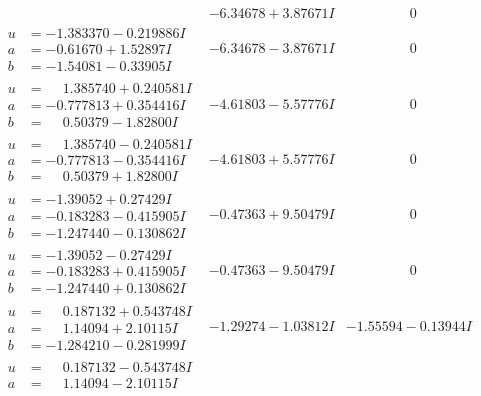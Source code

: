 \documentclass[1p]{elsarticle_modified}
\theoremstyle{definition}
\begin{document}
$$\begin{array}{c|c|c}
 & -6.34678 + 3.87671 I & \phantom{-0.000000 } 0 \\ \hline\begin{aligned}
u &= -1.383370 - 0.219886 I \\
a &= -0.61670 + 1.52897 I \\
b &= -1.54081 - 0.33905 I\end{aligned}
 & -6.34678 - 3.87671 I & \phantom{-0.000000 } 0 \\ \hline\begin{aligned}
u &= \phantom{-}1.385740 + 0.240581 I \\
a &= -0.777813 + 0.354416 I \\
b &= \phantom{-}0.50379 - 1.82800 I\end{aligned}
 & -4.61803 - 5.57776 I & \phantom{-0.000000 } 0 \\ \hline\begin{aligned}
u &= \phantom{-}1.385740 - 0.240581 I \\
a &= -0.777813 - 0.354416 I \\
b &= \phantom{-}0.50379 + 1.82800 I\end{aligned}
 & -4.61803 + 5.57776 I & \phantom{-0.000000 } 0 \\ \hline\begin{aligned}
u &= -1.39052 + 0.27429 I \\
a &= -0.183283 - 0.415905 I \\
b &= -1.247440 - 0.130862 I\end{aligned}
 & -0.47363 + 9.50479 I & \phantom{-0.000000 } 0 \\ \hline\begin{aligned}
u &= -1.39052 - 0.27429 I \\
a &= -0.183283 + 0.415905 I \\
b &= -1.247440 + 0.130862 I\end{aligned}
 & -0.47363 - 9.50479 I & \phantom{-0.000000 } 0 \\ \hline\begin{aligned}
u &= \phantom{-}0.187132 + 0.543748 I \\
a &= \phantom{-}1.14094 + 2.10115 I \\
b &= -1.284210 - 0.281999 I\end{aligned}
 & -1.29274 - 1.03812 I & -1.55594 - 0.13944 I \\ \hline\begin{aligned}
u &= \phantom{-}0.187132 - 0.543748 I \\
a &= \phantom{-}1.14094 - 2.10115 I \\

\end{aligned}
\end{array}$$
\end{document}
